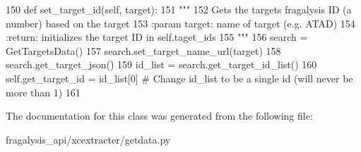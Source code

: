 \begin{DoxyCode}
150     \textcolor{keyword}{def }set\_target\_id(self, target):
151         \textcolor{stringliteral}{"""}
152 \textcolor{stringliteral}{        Gets the targets fragalysis ID (a number) based on the target}
153 \textcolor{stringliteral}{        :param target: name of target (e.g. ATAD)}
154 \textcolor{stringliteral}{        :return: initializes the target ID in self.taget\_ids}
155 \textcolor{stringliteral}{        """}
156         search = GetTargetsData()
157         search.set\_target\_name\_url(target)
158         search.get\_target\_json()
159         id\_list = search.get\_target\_id\_list()
160         self.get\_target\_id = id\_list[0]  \textcolor{comment}{# Change id\_list to be a single id (will never be more than 1)}
161 
\end{DoxyCode}


The documentation for this class was generated from the following file\+:\begin{DoxyCompactItemize}
\item 
fragalysis\+\_\+api/xcextracter/getdata.\+py\end{DoxyCompactItemize}
